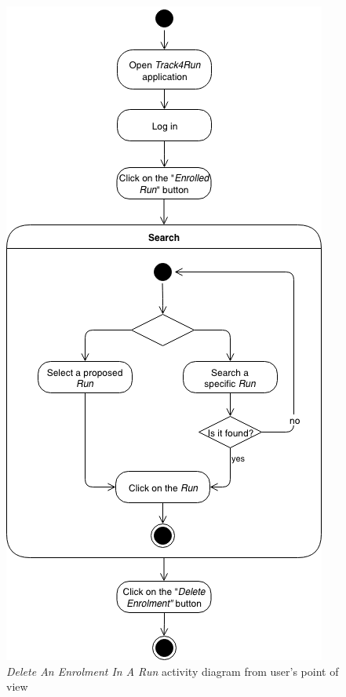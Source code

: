 \begin{figure}[H]
\begin{center}
  \includegraphics[height=0.6\paperheight]{img/activity/DeleteEnrolment.png}
  \hspace{0.05\linewidth}
  \centering
  \caption{\textit{Delete An Enrolment In A Run} activity diagram from user's point of view}
  \label{img:deleteEnrolmentActrivityDiagram}
\end{center}
\end{figure}

